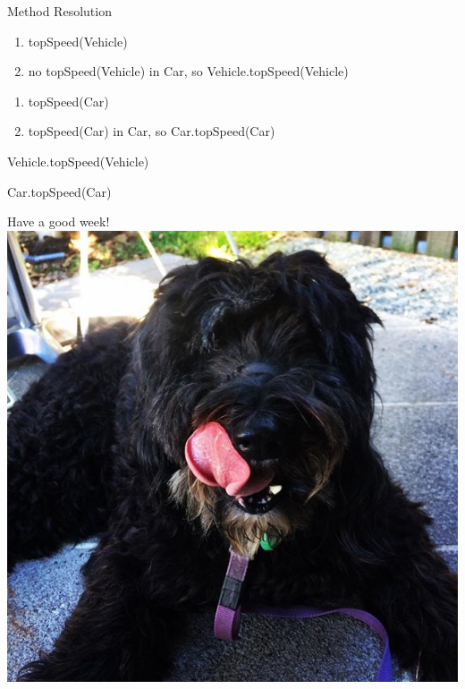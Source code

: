 \documentclass[week7]{csse2002}
\begin{document}
\begin{topic}{Method Resolution}
\begin{subtopic}{5}
\begin{enumerate}
	\item topSpeed(Vehicle)
	\item no topSpeed(Vehicle) in Car, so Vehicle.topSpeed(Vehicle)
\end{enumerate}
\end{subtopic}

\begin{subtopic}{6}
\begin{enumerate}
	\item topSpeed(Car)
	\item topSpeed(Car) in Car, so Car.topSpeed(Car)
\end{enumerate}
\end{subtopic}

\begin{subtopic}{7}
Vehicle.topSpeed(Vehicle)

Car.topSpeed(Car)
\end{subtopic}

\end{topic}


\begin{topic}{Have a good week!}
\includegraphics[width=\textwidth,keepaspectratio]{doggo2.jpg}
\end{topic}
\end{document}
